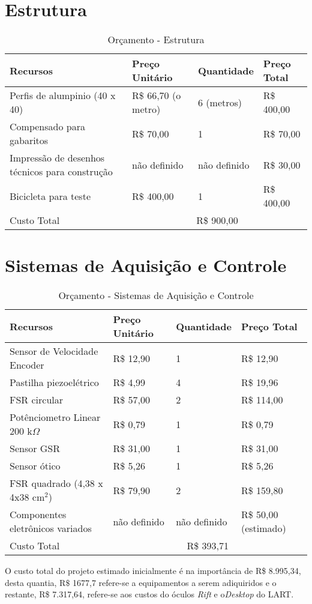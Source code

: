 \section{Estrutura}

\begin{table}[htp]
\centering
\caption{Orçamento - Estrutura}
\label{orcamento1}
\begin{tabular}{|p{6cm}|l|l|l|}
\hline
Recursos                 & Preço Unitário & Quantidade & Preço Total   \\ 
\hline
Perfis de alumpinio (40 x 40)       & R\$ 66,70 (o metro)   & 6 (metros)        & R\$ 400,00 \\ 
Compensado para gabaritos       & R\$ 70,00   & 1        & R\$ 70,00\\ 
Impressão de desenhos técnicos para construção     & não definido   & não definido        & R\$ 30,00\\ 
Bicicleta para teste    & R\$ 400,00   & 1        & R\$ 400,00\\ 
\hline
Custo Total &  \multicolumn{3}{|c|}{R\$ 900,00 }     \\ 

\hline
\end{tabular}
\end{table}

\section{Sistemas de Aquisição e Controle}

\begin{table}[H]
\centering
\caption{Orçamento - Sistemas de Aquisição e Controle}
\label{orcamento2}
\begin{tabular}{|p{6cm}|l|l|l|}
\hline
Recursos                 & Preço Unitário & Quantidade & Preço Total   \\ 
\hline
Sensor de Velocidade Encoder       & R\$ 12,90   & 1        & R\$ 12,90\\ 
Pastilha piezoelétrico      & R\$ 4,99   & 4        & R\$ 19,96\\ 
FSR circular     & R\$ 57,00  & 2        & R\$ 114,00\\ 
Potênciometro Linear 200 k$\Omega$   & R\$ 0,79   & 1        & R\$ 0,79\\ 

Sensor GSR  & R\$ 31,00   & 1        & R\$ 31,00\\ 

Sensor ótico   & R\$ 5,26   & 1        & R\$ 5,26\\ 

FSR quadrado (4,38 x 4x38 cm$^2$)   & R\$ 79,90   & 2        & R\$ 159,80\\ 

Componentes eletrônicos variados  & não definido   & não definido        & R\$ 50,00 (estimado)\\ 
\hline
Custo Total &  \multicolumn{3}{|c|}{R\$ 393,71  }     \\ 

\hline
\end{tabular}
\end{table}

	O custo total do projeto estimado inicialmente é na importância de R\$ 8.995,34, desta quantia, R$\$$ 1677,7 refere-se a equipamentos a serem adiquiridos e o restante, R\$ 7.317,64, refere-se aos custos do óculos \textit{Rift} e o\textit{Desktop} do LART.